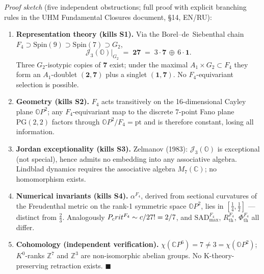 \emph{Proof sketch} (five independent obstructions; full proof with
explicit branching rules in the UHM Fundamental Closures document,
\S14, EN/RU):

\begin{enumerate}[leftmargin=2em,nosep]
  \item \textbf{Representation theory (kills S1).} Via the
        Borel--de~Siebenthal chain $F_4 \supset \mathrm{Spin}(9)
        \supset \mathrm{Spin}(7) \supset G_2$,
        \[
          \mathcal J_3(\mathbb O)\big|_{G_2} \;=\; \mathbf{27} \;=\;
          3 \cdot \mathbf 7 \,\oplus\, 6 \cdot \mathbf 1.
        \]
        Three $G_2$-isotypic copies of $\mathbf 7$ exist; under the
        maximal $A_1 \times G_2 \subset F_4$ they form an
        $A_1$-doublet $(\mathbf 2, \mathbf 7)$ plus a singlet
        $(\mathbf 1, \mathbf 7)$. No $F_4$-equivariant selection is
        possible.
  \item \textbf{Geometry (kills S2).} $F_4$ acts transitively on the
        16-dimensional Cayley plane $\mathbb O P^2$; any
        $F_4$-equivariant map to the discrete 7-point Fano plane
        $\mathrm{PG}(2,2)$ factors through $\mathbb O P^2 / F_4 =
        \mathrm{pt}$ and is therefore constant, losing all
        information.
  \item \textbf{Jordan exceptionality (kills S3).} Zelmanov (1983):
        $\mathcal J_3(\mathbb O)$ is exceptional (not special), hence
        admits no embedding into any associative algebra. Lindblad
        dynamics requires the associative algebra $M_7(\mathbb C)$;
        no homomorphism exists.
  \item \textbf{Numerical invariants (kills S4).} $\alpha^{F_4}$,
        derived from sectional curvatures of the Freudenthal metric
        on the rank-1 symmetric space $\mathbb O P^2$, lies in
        $[\tfrac14, \tfrac12]$ --- distinct from $\tfrac23$.
        Analogously $P_crit^{F_4} \sim c/27 != 2/7$, and
        $\mathrm{SAD}_{\max}^{F_4}$, $R_{\mathrm{th}}^{F_4}$,
        $\Phi_{\mathrm{th}}^{F_4}$ all differ.
  \item \textbf{Cohomology (independent verification).}
        $\chi(\mathbb C P^6) = 7 \neq 3 = \chi(\mathbb O P^2)$;
        $K^0$-ranks $\mathbb Z^7$ and $\mathbb Z^3$ are
        non-isomorphic abelian groups. No K-theory-preserving
        retraction exists. \hfill$\blacksquare$
\end{enumerate}

